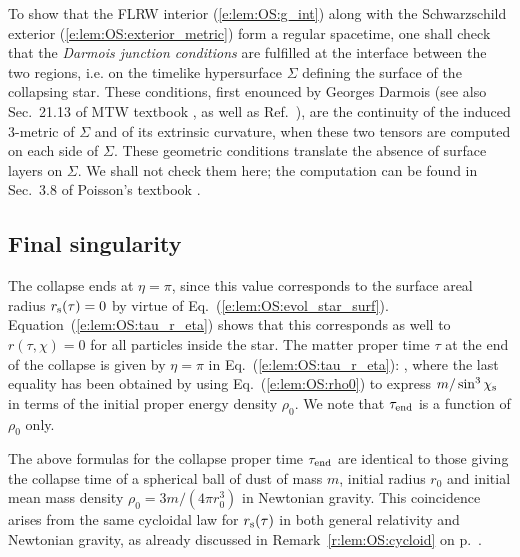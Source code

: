 To show that the FLRW interior (\ref{e:lem:OS:g_int})
along with the Schwarzschild exterior (\ref{e:lem:OS:exterior_metric})
form a regular spacetime, one shall check that the
\emph{Darmois junction conditions}
are fulfilled at the interface between the two regions, i.e. on the
timelike hypersurface $\Sigma$ defining the surface of the collapsing star.
These conditions, first enounced by Georges Darmois \cite{Darmo1927}
(see also Sec.~21.13 of MTW textbook \cite{MisneTW73}, as well as Ref.~\cite{Lake17}),
are the continuity of the induced 3-metric of $\Sigma$ and of
its extrinsic curvature,
when these two tensors are computed on each side of $\Sigma$.
These geometric conditions translate the absence of surface layers on $\Sigma$.
We shall not check them here; the computation can be found in
Sec.~3.8 of Poisson's textbook \cite{Poiss04}.


\subsection{Final singularity}

The collapse ends at $\eta = \pi$, since this value corresponds to the surface
areal radius $r_{\rm s}(\tau) = 0$ by virtue of Eq.~(\ref{e:lem:OS:evol_star_surf}).
Equation~(\ref{e:lem:OS:tau_r_eta}) shows that this corresponds as well
to $r(\tau,\chi) = 0$ for all
particles inside the star. The matter proper time $\tau$ at the end of the collapse
is given by $\eta=\pi$ in Eq.~(\ref{e:lem:OS:tau_r_eta}):
\be \label{e:lem:OS:tau_end}
   ,
\ee
where the last equality has been obtained by using Eq.~(\ref{e:lem:OS:rho0})
to express $m/\sin^3\chi_{\rm s}$ in terms of the initial proper energy density $\rho_0$.
We note that $\tau_{\rm end}$ is a function of $\rho_0$ only.

\begin{remark}
The above formulas for the collapse proper time $\tau_{\rm end}$ are identical
to those giving the collapse time of a spherical ball of dust of mass $m$, initial radius
$r_0$ and initial mean mass density $\rho_0=3 m/(4\pi r_0^3)$ in Newtonian gravity.
This coincidence arises from the
same cycloidal law for $r_{\rm s}(\tau)$ in both general relativity and Newtonian gravity,
as already discussed in Remark~\ref{r:lem:OS:cycloid} on p.~\pageref{r:lem:OS:cycloid}.
\end{remark}

